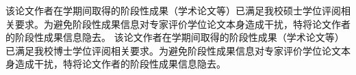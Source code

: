 \begin{resume}
\ifisanon
    \ifisblind
        \isanonfalse
    \else
        \ifismaster
        该论文作者在学期间取得的阶段性成果（学术论文等）已满足我校硕士学位评阅相关要求。为避免阶段性成果信息对专家评价学位论文本身造成干扰，特将论文作者的阶段性成果信息隐去。
        \else
        该论文作者在学期间取得的阶段性成果（学术论文等）已满足我校博士学位评阅相关要求。为避免阶段性成果信息对专家评价学位论文本身造成干扰，特将论文作者的阶段性成果信息隐去。
        \fi
    \fi
\else\relax
\fi

\ifisanon\relax
\else
\ifisresumebib

\begingroup
    \renewcommand{\bibfont}{\normalsize}%
    \makeatletter
    \renewcommand*{\mkbibnamegiven}[1]{%
    \ifitemannotation{thesisauthor}
    {\ifbibliography{{\textbf{#1}}}{#1}}%
    {#1}\ifbibliography{\ifitemannotation{corresponding}{\textsuperscript{*}}{}}{}%
    }
    \renewcommand*{\mkbibnamefamily}[1]{%
    \ifitemannotation{thesisauthor}
    {\ifbibliography{{\textbf{#1}}}{#1}}
    {#1}}
    \def\blx@maxbibnames{9}
    \def\blx@minbibnames{2}
    \makeatother


	\begin{refsection}
	\nocite{ref-1-1-Yang,ref-2-1-杨轶,ref-3-1-杨轶,ref-4-1-Yang,
    ref-5-1-Wu,ref-6-1-贾泽,ref-7-1-伍晓明}
	

\end{refsection}
\end{resume}
